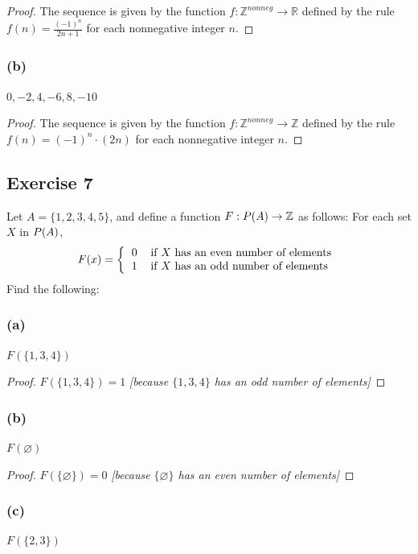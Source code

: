 \documentclass[14pt]{extarticle}
\let\mathscr\relax
\newcommand{\ps}{\mathscr{P}} %
\newcommand{\dps}{\displaystyle}
\newcommand{\es}{\varnothing}
\newcommand{\R}{\mathbb{R}}
\newcommand{\Z}{\mathbb{Z}}
\newcommand{\cy}{\color{cyan}}
\begin{document}
\begin{proof}
The sequence is given by the function \(f: \Z^{nonneg} \to \R\) defined by the rule \(\dps f(n)=\frac{(-1)^n}{2n+1}\)
{\cy for each nonnegative integer $n$.}
\end{proof}

\subsubsection{(b)}
\(0, -2, 4, -6, 8, -10\)

\begin{proof}
The sequence is given by the function \(f: \Z^{nonneg} \to \Z\) defined by the rule \(\dps f(n) = (-1)^n \cdot (2n)\)
{\cy for each nonnegative integer $n$.}
\end{proof}

\subsection{Exercise 7}
Let \(A = \{1, 2, 3, 4, 5\}\), and define a function \(F: \ps(A) \to \Z\) as follows: For each set $X$ in $\ps(A)$,
\[
F(x) =
\left\{
\begin{tabular}{ll}
\(0\) & if $X$ has an even number of elements \\
\(1\) & if $X$ has an odd number of elements
\end{tabular}
\right.
\]
Find the following:

\subsubsection{(a)}
\(F(\{1, 3, 4\})\) 

\begin{proof}
\(F(\{1, 3, 4\}) = 1\) {\it [because \(\{1, 3, 4\}\) has an odd number of elements]}

\end{proof}

\subsubsection{(b)}
\(F(\es)\)

\begin{proof}
\(F(\{\es\}) = 0\) {\it [because \(\{\es\}\) has an even number of elements]}
\end{proof}

\subsubsection{(c)}
\(F(\{2, 3\})\)
\end{document}
